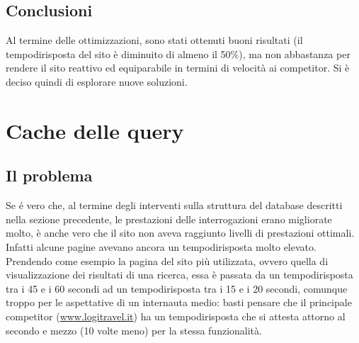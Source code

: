 \subsection{Conclusioni}
Al termine delle ottimizzazioni, sono stati ottenuti buoni risultati (il \gls{tempodirisposta} del sito è diminuito di almeno il 50\%), ma non abbastanza per rendere il sito reattivo ed equiparabile in termini di velocità ai competitor. Si è deciso quindi di esplorare nuove soluzioni.

\section{Cache delle query}
\subsection{Il problema}
Se é vero che, al termine degli interventi sulla struttura del database descritti nella sezione precedente, le prestazioni delle interrogazioni erano migliorate molto, è anche vero che il sito non aveva raggiunto livelli di prestazioni ottimali. Infatti alcune pagine avevano ancora un \gls{tempodirisposta} molto elevato. Prendendo come esempio la pagina del sito più utilizzata, ovvero quella di visualizzazione dei risultati di una ricerca, essa è passata da un \gls{tempodirisposta} tra i 45 e i 60 secondi ad un \gls{tempodirisposta} tra i 15 e i 20 secondi, comunque troppo per le aspettative di un internauta medio: basti pensare che il principale competitor (\url{www.logitravel.it}) ha un \gls{tempodirisposta} che si attesta attorno al secondo e mezzo (10 volte meno) per la stessa funzionalità.

